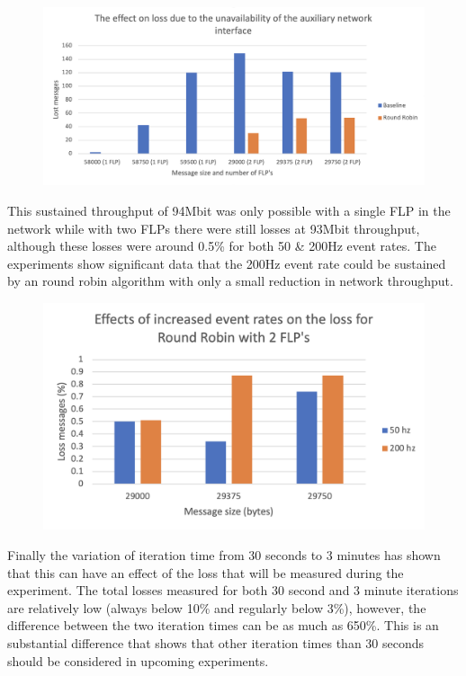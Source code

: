 \documentclass[]{article}
\begin{document}
\begin{center}
	\begin{figure}[H]
		\includegraphics[width=\textwidth]{"images/The effect on loss due to the unavailability of the auxiliary network interface"}
	\end{figure}
\end{center}

This sustained throughput of 94Mbit was only possible with a single FLP in the network while with two FLPs there were still losses at 93Mbit throughput, although these losses were around 0.5\% for both 50 \& 200Hz event rates. The experiments show significant data that the 200Hz event rate could be sustained by an round robin algorithm with only a small reduction in network throughput.

\begin{center}
	\begin{figure}[H]
		\includegraphics[width=\textwidth]{"images/Effects of increased event rates on the loss for Round Robin with 2 FLP's"}
	\end{figure}
\end{center}

Finally the variation of iteration time from 30 seconds to 3 minutes has shown that this can have an effect of the loss that will be measured during the experiment. The total losses measured for both 30 second and 3 minute iterations are relatively low (always below 10\% and regularly below 3\%), however, the difference between the two iteration times can be as much as 650\%. This is an substantial difference that shows that other iteration times than 30 seconds should be considered in upcoming experiments.
\end{document}
